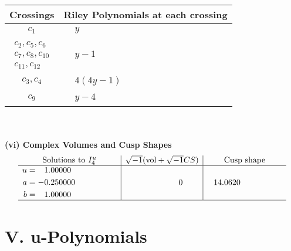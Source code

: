 \documentclass[1p]{elsarticle_modified}
\theoremstyle{definition}
\newcommand{\I}{\sqrt{-1}}
\begin{document}
\begin{tabular}{m{50pt}|m{274pt}}
Crossings & \hspace{64pt}Riley Polynomials at each crossing \\
\hline $$\begin{aligned}c_{1}\end{aligned}$$&$\begin{aligned}
&y
\end{aligned}$\\
\hline $$\begin{aligned}c_{2},c_{5},c_{6}\\c_{7},c_{8},c_{10}\\c_{11},c_{12}\end{aligned}$$&$\begin{aligned}
&y-1
\end{aligned}$\\
\hline $$\begin{aligned}c_{3},c_{4}\end{aligned}$$&$\begin{aligned}
&4(4 y-1)
\end{aligned}$\\
\hline $$\begin{aligned}c_{9}\end{aligned}$$&$\begin{aligned}
&y-4
\end{aligned}$\\
\hline
\end{tabular}\\~\\
\newpage\flushleft \textbf{(vi) Complex Volumes and Cusp Shapes}
$$\begin{array}{c|c|c}  
\text{Solutions to }I^u_{4}& \I (\text{vol} + \sqrt{-1}CS) & \text{Cusp shape}\\
 \hline 
\begin{aligned}
u &= \phantom{-}1.00000\phantom{ +0.000000I} \\
a &= -0.250000\phantom{ +0.000000I} \\
b &= \phantom{-}1.00000\phantom{ +0.000000I}\end{aligned}
 & \phantom{-0.000000 } 0 & \phantom{-}14.0620\phantom{ +0.000000I}\\
 \hline 
 \end{array}$$\newpage
\newpage\renewcommand{\arraystretch}{1}
\centering \section*{ V. u-Polynomials}
\end{document}
